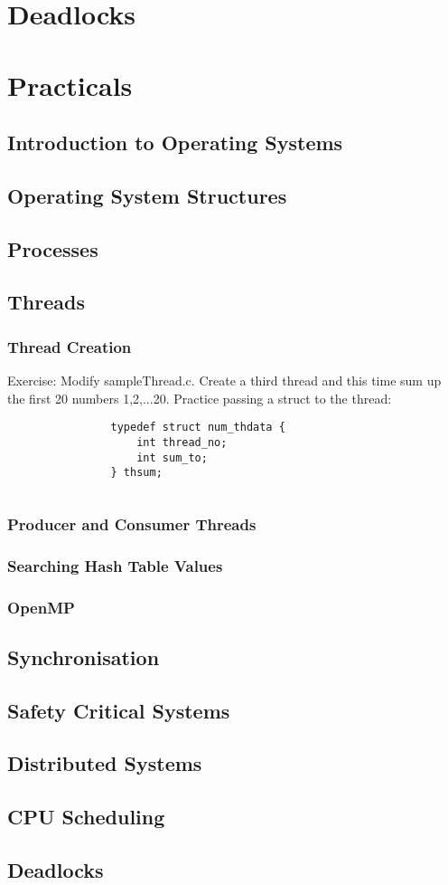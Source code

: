 \documentclass{book}
\begin{document}
    \chapter{Deadlocks}
    \chapter{Practicals}
        \section{Introduction to Operating Systems}
        \section{Operating System Structures}
        \section{Processes}
        \section{Threads}
            \subsection{Thread Creation}
            Exercise: Modify sampleThread.c. Create a third thread and this time sum up the first 20 numbers {1,2,...20}.
            Practice passing a struct to the thread:
            \begin{verbatim}
                typedef struct num_thdata {
                    int thread_no;
                    int sum_to;
                } thsum;
            \end{verbatim}
                \inputminted{c}{code/threads/prac/sampleThread.c}
            \subsection{Producer and Consumer Threads}
            \subsection{Searching Hash Table Values}
            \subsection{OpenMP}
        \section{Synchronisation}
        \section{Safety Critical Systems}
        \section{Distributed Systems}
        \section{CPU Scheduling}
        \section{Deadlocks}
\end{document}
